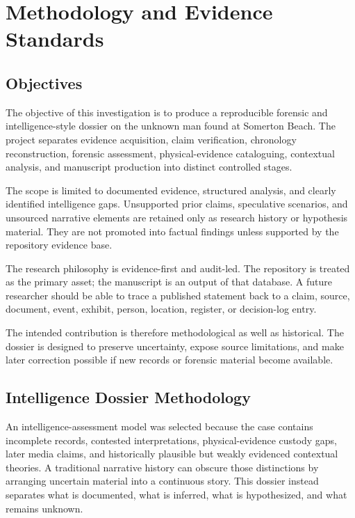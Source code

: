 \chapter{Methodology and Evidence Standards}
\label{chap:methodology}


\section{Objectives}

The objective of this investigation is to produce a reproducible forensic and intelligence-style dossier on the unknown man found at Somerton Beach. The project separates evidence acquisition, claim verification, chronology reconstruction, forensic assessment, physical-evidence cataloguing, contextual analysis, and manuscript production into distinct controlled stages.

The scope is limited to documented evidence, structured analysis, and clearly identified intelligence gaps. Unsupported prior claims, speculative scenarios, and unsourced narrative elements are retained only as research history or hypothesis material. They are not promoted into factual findings unless supported by the repository evidence base.

The research philosophy is evidence-first and audit-led. The repository is treated as the primary asset; the manuscript is an output of that database. A future researcher should be able to trace a published statement back to a claim, source, document, event, exhibit, person, location, register, or decision-log entry.

The intended contribution is therefore methodological as well as historical. The dossier is designed to preserve uncertainty, expose source limitations, and make later correction possible if new records or forensic material become available.

\section{Intelligence Dossier Methodology}

An intelligence-assessment model was selected because the case contains incomplete records, contested interpretations, physical-evidence custody gaps, later media claims, and historically plausible but weakly evidenced contextual theories. A traditional narrative history can obscure those distinctions by arranging uncertain material into a continuous story. This dossier instead separates what is documented, what is inferred, what is hypothesized, and what remains unknown.


